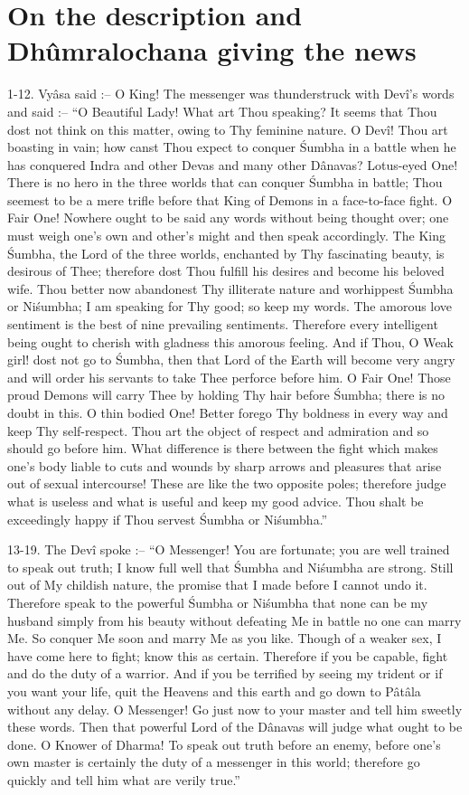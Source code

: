 ﻿\chapter{On the description and Dh\^umralochana giving the news}

1-12. Vy\^asa said :-- O King! The messenger was thunderstruck with Dev\^i's words and said :-- ``O Beautiful Lady! What art Thou speaking? It seems that Thou dost not think on this matter, owing to Thy feminine nature. O Dev\^i! Thou art boasting in vain; how canst Thou expect to conquer \'Sumbha in a battle when he has conquered Indra and other Devas and many other D\^anavas? Lotus-eyed One! There is no hero in the three worlds that can conquer \'Sumbha in battle; Thou seemest to be a mere trifle before that King of Demons in a face-to-face fight. O Fair One! Nowhere ought to be said any words without being thought over; one must weigh one's own and other's might and then speak accordingly. The King \'Sumbha, the Lord of the three worlds, enchanted by Thy fascinating beauty, is desirous of Thee; therefore dost Thou fulfill his desires and become his beloved wife. Thou better now abandonest Thy illiterate nature and worhippest \'Sumbha or Ni\'sumbha; I am speaking for Thy good; so keep my words. The amorous love sentiment is the best of nine prevailing sentiments. Therefore every intelligent being ought to cherish with gladness this amorous feeling. And if Thou, O Weak girl! dost not go to \'Sumbha, then that Lord of the Earth will become very angry and will order his servants to take Thee perforce before him. O Fair One! Those proud Demons will carry Thee by holding Thy hair before \'Sumbha; there is no doubt in this. O thin bodied One! Better forego Thy boldness in every way and keep Thy self-respect. Thou art the object of respect and admiration and so should go before him. What difference is there between the fight which makes one's body liable to cuts and wounds by sharp arrows and pleasures that arise out of sexual intercourse! These are like the two opposite poles; therefore judge what is useless and what is useful and keep my good advice. Thou shalt be exceedingly happy if Thou servest \'Sumbha or Ni\'sumbha.''

13-19. The Dev\^i spoke :-- ``O Messenger! You are fortunate; you are well trained to speak out truth; I know full well that \'Sumbha and Ni\'sumbha are strong. Still out of My childish nature, the promise that I made before I cannot undo it. Therefore speak to the powerful \'Sumbha or Ni\'sumbha that none can be my husband simply from his beauty without defeating Me in battle no one can marry Me. So conquer Me soon and marry Me as you like. Though of a weaker sex, I have come here to fight; know this as certain. Therefore if you be capable, fight and do the duty of a warrior. And if you be terrified by seeing my trident or if you want your life, quit the Heavens and this earth and go down to P\^at\^ala without any delay. O Messenger! Go just now to your master and tell him sweetly these words. Then that powerful Lord of the D\^anavas will judge what ought to be done. O Knower of Dharma! To speak out truth before an enemy, before one's own master is certainly the duty of a messenger in this world; therefore go quickly and tell him what are verily true.''

